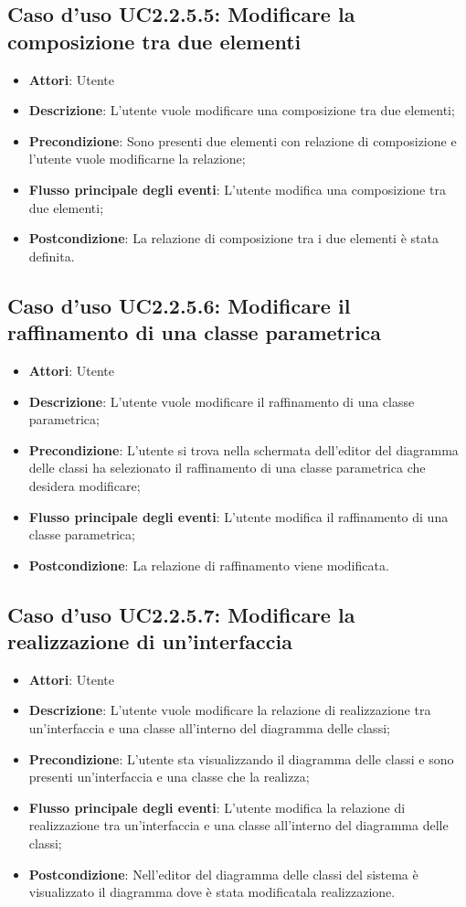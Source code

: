\documentclass[../AnalisiDeiRequisiti.tex]{subfiles}
\begin{document}
			\subsection{Caso d'uso UC2.2.5.5: Modificare la composizione tra due elementi}
			\begin{itemize}
				\item \textbf{Attori}: Utente
				\item \textbf{Descrizione}: L'utente vuole modificare una composizione tra due elementi;
				\item \textbf{Precondizione}: Sono presenti due elementi con relazione di composizione e l'utente vuole modificarne la relazione;
				\item \textbf{Flusso principale degli eventi}: L'utente modifica una composizione tra due elementi;
				\item \textbf{Postcondizione}: La relazione di composizione tra i due elementi è stata definita.	
			\end{itemize}
			\subsection{Caso d'uso UC2.2.5.6: Modificare il raffinamento di una classe parametrica}
			\begin{itemize}
				\item \textbf{Attori}: Utente
				\item \textbf{Descrizione}: L'utente vuole modificare il raffinamento di una classe parametrica;
				\item \textbf{Precondizione}: L'utente si trova nella schermata dell'editor del diagramma delle classi ha selezionato il raffinamento di una classe parametrica che desidera modificare;
				\item \textbf{Flusso principale degli eventi}: L'utente modifica il raffinamento di una classe parametrica;
				\item \textbf{Postcondizione}: La relazione di raffinamento viene modificata.
			\end{itemize}
			\subsection{Caso d'uso UC2.2.5.7: Modificare la realizzazione di un'interfaccia}
			\begin{itemize}
				\item \textbf{Attori}: Utente
				\item \textbf{Descrizione}: L'utente vuole modificare la relazione di realizzazione tra un'interfaccia e una classe all'interno del diagramma delle classi;
				\item \textbf{Precondizione}: L'utente sta visualizzando il diagramma delle classi e sono presenti un'interfaccia e una classe che la realizza;
				\item \textbf{Flusso principale degli eventi}: L'utente modifica la relazione di realizzazione tra un'interfaccia e una classe all'interno del diagramma delle classi;
				\item \textbf{Postcondizione}: Nell'editor del diagramma delle classi del sistema è visualizzato il diagramma dove è stata modificatala realizzazione.
			\end{itemize}
\end{document}
